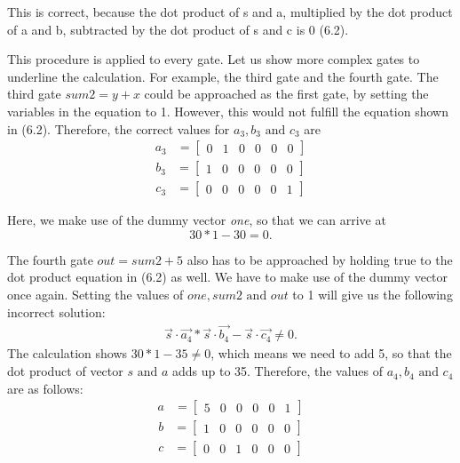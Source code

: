 This is correct, because the dot product of s and a, multiplied by the dot product of a and b, subtracted by the dot product of s and c is 0 (6.2).

This procedure is applied to every gate. Let us show more complex gates to underline the calculation. For example, the third gate and the fourth gate. The third gate \(sum2=y+x\) could be approached as the first gate, by setting the variables in the equation to 1. However, this would not fulfill the equation shown in (6.2). Therefore, the correct values for \(a_3, b_3 \text{ and }c_3\) are
\begin{align*}
    a_3 &=\begin{bmatrix}
        0 & 1 & 0 & 0 & 0 & 0
    \end{bmatrix}
\end{align*}
\begin{align*}
    b_3&=\begin{bmatrix}
        1 & 0 & 0 & 0 & 0 & 0 
    \end{bmatrix}
\end{align*}
\begin{align*}
    c_3&=\begin{bmatrix}
        0 & 0 & 0 & 0 & 0 & 1
    \end{bmatrix}
\end{align*}

Here, we make use of the dummy vector \textit{one}, so that we can arrive at 
\[30 * 1 - 30 = 0.\]

The fourth gate \(out=sum2+5\) also has to be approached by holding true to the dot product equation in (6.2) as well. We have to make use of the dummy vector once again. Setting the values of \(one, sum2 \text{ and } out\)  to 1 will give us the following incorrect solution:
\begin{align*}
     \Vec{s}\cdot\Vec{a_4} * \Vec{s}\cdot\Vec{b_4} - \Vec{s}\cdot\Vec{c_4} \neq 0.
\end{align*}
The calculation shows \(30 * 1 - 35 \neq 0\), which means we need to add 5, so that the dot product of vector \(s \text{ and } a\) adds up to 35. Therefore, the values of \(a_4, b_4 \text{ and }c_4\) are as follows:
\begin{align*}
    a &=\begin{bmatrix}
        5 & 0 & 0 & 0 & 0 & 1
    \end{bmatrix}
\end{align*}
\begin{align*}
    b&=\begin{bmatrix}
        1 & 0 & 0 & 0 & 0 & 0 
    \end{bmatrix}
\end{align*}
\begin{align*}
    c&=\begin{bmatrix}
        0 & 0 & 1 & 0 & 0 & 0
    \end{bmatrix}
\end{align*}

